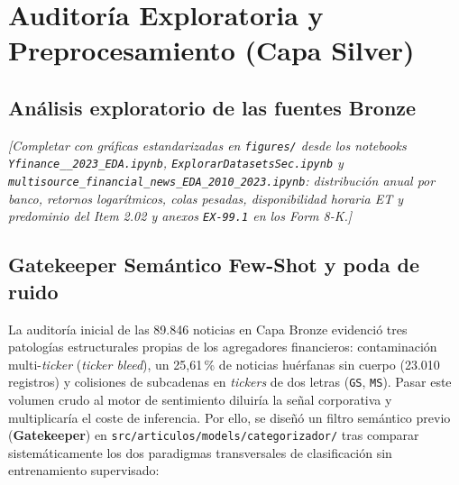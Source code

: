 \chapter{Auditoría Exploratoria y Preprocesamiento (Capa Silver)}

\section{Análisis exploratorio de las fuentes Bronze}
\textit{[Completar con gráficas estandarizadas en \texttt{figures/} desde los notebooks \texttt{Yfinance\_\_2023\_EDA.ipynb}, \texttt{Explorar\allowbreak DatasetsSec.ipynb} y \texttt{multisource\_\allowbreak financial\_news\_\allowbreak EDA\_2010\_2023.ipynb}: distribución anual por banco, retornos logarítmicos, colas pesadas, disponibilidad horaria ET y predominio del Item 2.02 y anexos \texttt{EX-99.1} en los Form 8-K.]}

\section{Gatekeeper Semántico Few-Shot y poda de ruido}
La auditoría inicial de las 89.846 noticias en Capa Bronze evidenció tres patologías estructurales propias de los agregadores financieros: contaminación multi-\textit{ticker} (\textit{ticker bleed}), un 25,61\,\% de noticias huérfanas sin cuerpo (23.010 registros) y colisiones de subcadenas en \textit{tickers} de dos letras (\texttt{GS}, \texttt{MS}). Pasar este volumen crudo al motor de sentimiento diluiría la señal corporativa y multiplicaría el coste de inferencia. Por ello, se diseñó un filtro semántico previo (\textbf{Gatekeeper}) en \texttt{src/articulos/models/categorizador/} tras comparar sistemáticamente los dos paradigmas transversales de clasificación sin entrenamiento supervisado:

